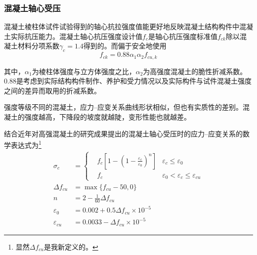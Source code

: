 \documentclass{article}
\begin{document}
\subsubsection{混凝土轴心受压}
\par 混凝土棱柱体试件试验得到的轴心抗拉强度值能更好地反映混凝土结构构件中混凝土实际抗压能力。混凝土轴心抗压强度设计值$f_c$是轴心抗压强度标准值$f_{ck}$除以混凝土材料分项系数$\gamma_c=1.4$得到的。而\gb{}偏于安全地使用
$$
      f_{ck} = 0.88 \alpha_1 \alpha_2 f_{cu,k}
$$
\par 其中，$\alpha_1$为棱柱体强度与立方体强度之比，$\alpha_2$为高强度混凝土的脆性折减系数。0.88是考虑到实际结构构件制作、养护和受力情况以及实际构件与试件混凝土强度之间的差异而取用的折减系数。
\begin{center}
\end{center}
\par 强度等级不同的混凝土，应力--应变关系曲线形状相似，但也有实质性的差别。混凝土的强度越高，下降段的坡度就越陡，变形性能也就越差。
\par \gb{}结合近年对高强混凝土的研究成果提出的混凝土轴心受压时的应力--应变关系的数学表达式为\footnote{显然$\Delta f_{cu}$是我新定义的。}
\begin{align*}
      \sigma_c         & =
      \left\{ \begin{aligned}
                     & f_c[1-(1-\frac{\varepsilon_c}{\varepsilon_0})^n] & \varepsilon_c \leq \varepsilon_0                    \\
                     & f_c                                              & \varepsilon_0 < \varepsilon_c \leq \varepsilon_{cu}
              \end{aligned} \right. \\
      \Delta f_{cu}    & = \max \{f_{cu}-50, 0\}                                                                        \\
      n                & = 2 - \frac{1}{60} \Delta f_{cu}                                                               \\
      \varepsilon_0    & =0.002 + 0.5 \Delta f_{cu} \times 10^{-5}                                                      \\
      \varepsilon_{cu} & =0.0033 - \Delta f_{cu} \times 10^{-5}
\end{align*}
\end{document}
